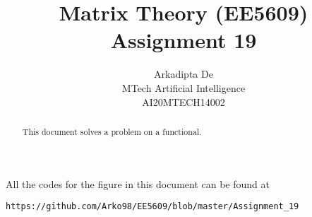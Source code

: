 \documentclass[journal,12pt,twocolumn]{IEEEtran}
\DeclareMathOperator*{\Res}{Res}
\begin{document}
\providecommand{\abs}[1]{\left\vert#1\right\vert}
\providecommand{\res}[1]{\Res\displaylimits_{#1}} 
\providecommand{\norm}[1]{\left\lVert#1\right\rVert}
\providecommand{\mtx}[1]{\mathbf{#1}}
\providecommand{\mean}[1]{E\left[ #1 \right]}
\providecommand{\fourier}{\overset{\mathcal{F}}{ \rightleftharpoons}}
\providecommand{\system}{\overset{\mathcal{H}}{ \longleftrightarrow}}
\newcommand{\solution}{\noindent \textbf{Solution: }}
\newcommand{\cosec}{\,\text{cosec}\,}
\providecommand{\dec}[2]{\ensuremath{\overset{#1}{\underset{#2}{\gtrless}}}}
\newcommand{\myvec}[1]{\ensuremath{\begin{pmatrix}#1\end{pmatrix}}}
\newcommand{\mydet}[1]{\ensuremath{\begin{vmatrix}#1\end{vmatrix}}}
\makeatletter
{}
\makeatother
\let\StandardTheFigure\thefigure
\let\vec\mathbf
\renewcommand{\thefigure}{\theproblem}
\def\putbox#1#2#3{\makebox[0in][l]{\makebox[#1][l]{}\raisebox{\baselineskip}[0in][0in]{\raisebox{#2}[0in][0in]{#3}}}}
     \def\rightbox#1{\makebox[0in][r]{#1}}
     \def\centbox#1{\makebox[0in]{#1}}
     \def\topbox#1{\raisebox{-\baselineskip}[0in][0in]{#1}}
     \def\midbox#1{\raisebox{-0.5\baselineskip}[0in][0in]{#1}}
\vspace{3cm}
\title{Matrix Theory (EE5609) Assignment 19}
\author{Arkadipta De\\MTech Artificial Intelligence\\AI20MTECH14002}

\maketitle
\newpage
\bigskip
\renewcommand{\thefigure}{\theenumi}
\renewcommand{\thetable}{\theenumi}

\begin{abstract}
This document solves a problem on a functional. 
\end{abstract}
All the codes for the figure in this document can be found at
\begin{lstlisting}
https://github.com/Arko98/EE5609/blob/master/Assignment_19
\end{lstlisting}
\end{document}
